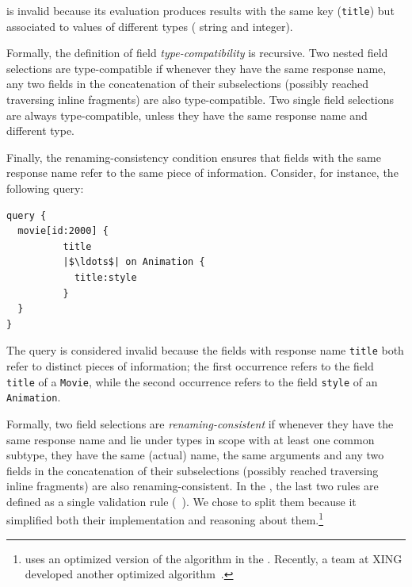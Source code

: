 \noindent is invalid because its evaluation produces results with the same key 
(\texttt{title}) but associated to values of different types (\ie
string and integer).

Formally, the definition of field \emph{type-compatibility} is
recursive. Two nested field selections are type-compatible if whenever
they have the same response name, any two fields in the concatenation
of their subselections (possibly reached traversing inline fragments)
are also type-compatible. Two single field selections are always
type-compatible, unless they have the same response name and
different %
type.

Finally, the renaming-consistency condition ensures that fields with
the same response name refer to the same piece of
information. Consider, for instance, the following query:
\begin{verbatim}
query { 
  movie[id:2000] {
          title   
          |$\ldots$| on Animation { 
            title:style
          } 
  }
}
\end{verbatim}

\noindent The query is considered invalid because the fields with response name \texttt{title} both refer to distinct pieces of information;
the first occurrence refers to the field \texttt{title} of a \texttt{Movie}, while the second
occurrence refers to the field \texttt{style} of an \texttt{Animation}.


Formally, two field selections are \emph{renaming-consistent} if
whenever they have the same response name and lie under types in scope
with at least one common subtype,
they have the same (actual) name, the same arguments and any two
fields in the concatenation of their subselections (possibly reached
traversing inline fragments) are also renaming-consistent.
%
In the \spec, the last two rules are defined as a single validation
rule (\cf~\cite[\S5.3.2]{gqlspec}). 
%
We chose to split them because it simplified both their implementation and reasoning about them.\footnote{\gcoql uses an optimized
  version of the algorithm in the \spec. Recently, a team at XING
  developed another optimized algorithm~\cite{xingalg}.}

